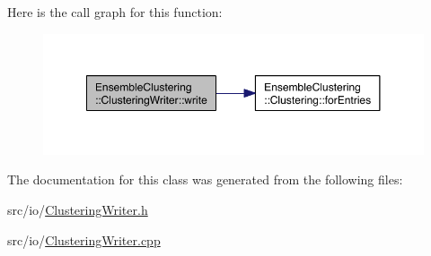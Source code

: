 Here is the call graph for this function\-:
\nopagebreak
\begin{figure}[H]
\begin{center}
\leavevmode
\includegraphics[width=350pt]{class_ensemble_clustering_1_1_clustering_writer_a9cc49082512a9063b28f14a70d7b6336_cgraph}
\end{center}
\end{figure}




The documentation for this class was generated from the following files\-:\begin{DoxyCompactItemize}
\item 
src/io/\hyperlink{_clustering_writer_8h}{Clustering\-Writer.\-h}\item 
src/io/\hyperlink{_clustering_writer_8cpp}{Clustering\-Writer.\-cpp}\end{DoxyCompactItemize}

